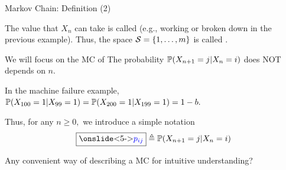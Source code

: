 \begin{frame}{Markov Chain: Definition (2)}


\plitemsep 0.1in

\bci 

\item<1-> The value that $X_n$ can take is called  (e.g., working or broken down in the previous example). Thus, the space $\mathcal S=\{1, \ldots, m \}$ is called .

\item<2-> We will focus on the MC of  The probability $\mathbb{P}( X_{n+1} = j \vert X_{n} = i )$ does NOT depends on $n.$ 

  \bci
  \item<3-> In the machine failure example, $\mathbb{P}( X_{100}=1 | X_{99} =1 )
    =\mathbb{P}( X_{200}=1 | X_{199} =1 ) = 1-b.$
  \eci

  \medskip

\item<4-> 
Thus, for any $n \ge 0,$ we introduce a simple notation 
$$
\blueblank{5}{\text{$p_{ij}$}} \eqdef\cprob{X_{n+1} = j \vert X_{n} = i}
$$

\item<5->  Any convenient way of describing a MC for intuitive understanding?

\eci 
\end{frame}





